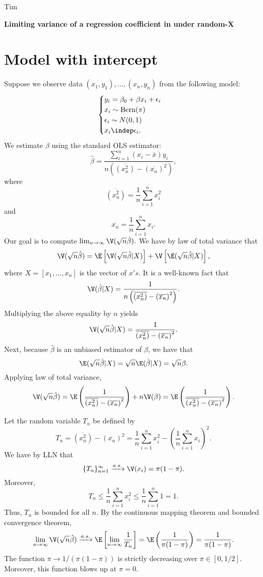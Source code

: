 \documentclass[12pt]{article}
\begin{document}
\noindent	
Tim
\begin{center}
\textbf{Limiting variance of a regression coefficient in under random-X}
\end{center}

\section{Model with intercept}

\noindent
Suppose we observe data $(x_1, y_1), \dots, (x_n, y_n)$ from the following model:
$$
\begin{cases}
y_i = \beta_0 + \beta x_i + \epsilon_i \\
x_i \sim \textrm{Bern}(\pi) \\
\epsilon_i \sim N(0,1) \\
x_i \indep \epsilon _i.
\end{cases}
$$
We estimate $\beta$ using the standard OLS estimator:
$$ \hat{\beta} = \frac{ \sum_{i=1}^n (x_i - \bar{x}) y_i }{ n \left( \overline{(x^2_n)} - \left( \overline{x_n} \right)^2  \right)},$$
where 
$$\overline{(x^2_n)} = \frac{1}{n}\sum_{i=1}^n x_i^2$$ and $$ \overline{x_n} = \frac{1}{n} \sum_{i=1}^n x_i.$$ Our goal is to compute $\lim_{n\to\infty} \V( \sqrt{n} \hat{\beta}).$ We have by law of total variance that
$$\V(\sqrt{n} \hat{\beta}) = \E\left[ \V(\sqrt{n}\hat{\beta} | X ) \right] + \V \left[ \E ( \sqrt{n} \hat{\beta}|X) \right],$$ where $X = [x_1, \dots, x_n]$ is the vector of $x's$. It is a well-known fact that
$$ \V(\hat{\beta} | X) = \frac{ 1 }{n \left( \overline{(x^2_n)} - \left( \overline{x_n} \right)^2  \right)}.$$ Multiplying the above equality by $n$ yields $$\V( \sqrt{n} \hat{\beta} | X ) = \frac{1}{\overline{(x^2_n)} - \left( \overline{x_n} \right)^2}.$$ Next, because $\hat{\beta}$ is an unbiased estimator of $\beta$, we have that
$$ \E( \sqrt{n} \hat{\beta} | X ) = \sqrt{n} \E(\hat{\beta}|X)  = \sqrt{n} \beta.$$ Applying law of total variance,
$$\V(\sqrt{n}\hat{\beta}) = \E \left(\frac{1}{\overline{(x^2_n)} - \left( \overline{x_n} \right)^2} \right) + n \V(\beta) = \E \left(\frac{1}{\overline{(x^2_n)} - \left( \overline{x_n} \right)^2} \right) .$$

Let the random variable $T_n$ be defined by
$$T_n = \overline{ (x_n^2)} - (\overline{x_n})^2 = \frac{1}{n}\sum_{i=1}^n x_i^2 - \left(\frac{1}{n} \sum_{i=1}^n x_i \right)^2.$$ We have by LLN that
$$\{ T_n \}_{n=1}^\infty \xrightarrow{a.s.} \V(x_i) = \pi (1-\pi).$$
Moreover, 
$$T_n \leq \frac{1}{n} \sum_{i=1}^n x_i^2 \leq \frac{1}{n} \sum_{i=1}^n 1 = 1.$$ Thus, $T_n$ is bounded for all $n$. By the continuous mapping theorem and bounded convergence theorem,
$$\lim_{n \to \infty} \V(\sqrt{n} \hat{\beta}) \xrightarrow{a.s.} \E \left[ \lim_{n \to \infty} \frac{1}{T_n} \right] = \E \left( \frac{1}{\pi(1-\pi)}\right) = \frac{1}{\pi(1-\pi)}.$$
The function $\pi \to 1/(\pi(1 - \pi))$ is strictly decreasing over $\pi \in [0,1/2]$. Moreover, this function blows up at $\pi = 0$.
% 
% 
\end{document}
